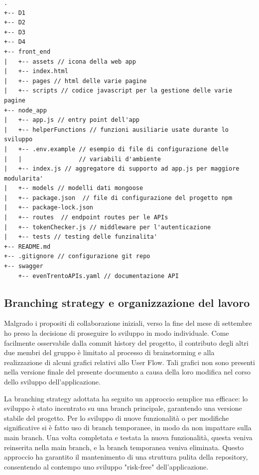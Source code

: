\documentclass[9pt]{extarticle}
\begin{document}
\begin{lstlisting}[style=treestyle, caption=Struttura della repository]
.
+-- D1
+-- D2
+-- D3
+-- D4
+-- front_end
|   +-- assets // icona della web app
|   +-- index.html
|   +-- pages // html delle varie pagine
|   +-- scripts // codice javascript per la gestione delle varie pagine
+-- node_app
|   +-- app.js // entry point dell'app
|   +-- helperFunctions // funzioni ausiliarie usate durante lo sviluppo
|   +-- .env.example // esempio di file di configurazione delle
|   |                // variabili d'ambiente
|   +-- index.js // aggregatore di supporto ad app.js per maggiore modularita'
|   +-- models // modelli dati mongoose
|   +-- package.json  // file di configurazione del progetto npm
|   +-- package-lock.json
|   +-- routes  // endpoint routes per le APIs
|   +-- tokenChecker.js // middleware per l'autenticazione
|   +-- tests // testing delle funzinalita'
+-- README.md
+-- .gitignore // configurazione git repo
+-- swagger
    +-- evenTrentoAPIs.yaml // documentazione API
\end{lstlisting}


\subsection{Branching strategy e organizzazione del lavoro}

Malgrado i propositi di collaborazione iniziali, verso la fine del mese di
settembre ho preso la decisione di proseguire lo sviluppo in modo individuale.
Come facilmente osservabile dalla commit history del progetto, il contributo
degli altri due membri del gruppo è limitato al processo di brainstorming e
alla realizzazione di alcuni grafici relativi allo User Flow. Tali grafici non
sono presenti nella versione finale del presente documento a causa della loro
modifica nel corso dello sviluppo dell'applicazione.

La branching strategy adottata ha seguito un approccio semplice ma efficace: lo sviluppo è stato incentrato su una
branch principale, garantendo una versione stabile del progetto. Per lo sviluppo di nuove funzionalità o per modifiche significative si è fatto uso di branch temporanee, in modo da non impattare sulla main branch. Una volta completata e testata la nuova funzionalità, questa veniva reinserita nella main branch, e la branch temporanea veniva eliminata. Questo approccio ha garantito il mantenimento di una struttura pulita della repository, consentendo al contempo uno sviluppo "risk-free" dell'applicazione.
\end{document}
